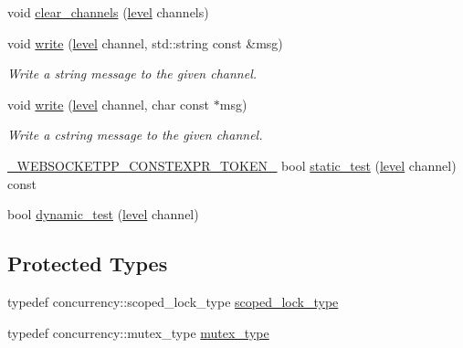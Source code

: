 \begin{DoxyCompactItemize}
\item 
void \hyperlink{classwebsocketpp_1_1log_1_1basic_a46bedf7f2bca8e28b39d0b6a4816a8d1}{clear\+\_\+channels} (\hyperlink{namespacewebsocketpp_1_1log_a12d4d17939f102db8c9183d400a41960}{level} channels)
\item 
void \hyperlink{classwebsocketpp_1_1log_1_1basic_a9f87a8c3e5d8e25e5f014756827a587a}{write} (\hyperlink{namespacewebsocketpp_1_1log_a12d4d17939f102db8c9183d400a41960}{level} channel, std\+::string const \&msg)
\begin{DoxyCompactList}\small\item\em Write a string message to the given channel. \end{DoxyCompactList}\item 
void \hyperlink{classwebsocketpp_1_1log_1_1basic_a693e6a522f654fd131a0c6f8d084c921}{write} (\hyperlink{namespacewebsocketpp_1_1log_a12d4d17939f102db8c9183d400a41960}{level} channel, char const $\ast$msg)
\begin{DoxyCompactList}\small\item\em Write a cstring message to the given channel. \end{DoxyCompactList}\item 
\hyperlink{boost__config_8hpp_a3dc3ece336a6149d2fe208a9daf66043}{\+\_\+\+W\+E\+B\+S\+O\+C\+K\+E\+T\+P\+P\+\_\+\+C\+O\+N\+S\+T\+E\+X\+P\+R\+\_\+\+T\+O\+K\+E\+N\+\_\+} bool \hyperlink{classwebsocketpp_1_1log_1_1basic_a3f5225ca4b38f547da9db3fd7514dd2a}{static\+\_\+test} (\hyperlink{namespacewebsocketpp_1_1log_a12d4d17939f102db8c9183d400a41960}{level} channel) const 
\item 
bool \hyperlink{classwebsocketpp_1_1log_1_1basic_a8f443b4ff286da803a114897a8f97105}{dynamic\+\_\+test} (\hyperlink{namespacewebsocketpp_1_1log_a12d4d17939f102db8c9183d400a41960}{level} channel)
\end{DoxyCompactItemize}
\subsection*{Protected Types}
\begin{DoxyCompactItemize}
\item 
typedef concurrency\+::scoped\+\_\+lock\+\_\+type \hyperlink{classwebsocketpp_1_1log_1_1basic_aa11847dfc30ac1f1c9c5fc599132560f}{scoped\+\_\+lock\+\_\+type}
\item 
typedef concurrency\+::mutex\+\_\+type \hyperlink{classwebsocketpp_1_1log_1_1basic_a293124c7129b2c70c8ed33d355d3b355}{mutex\+\_\+type}
\end{DoxyCompactItemize}

